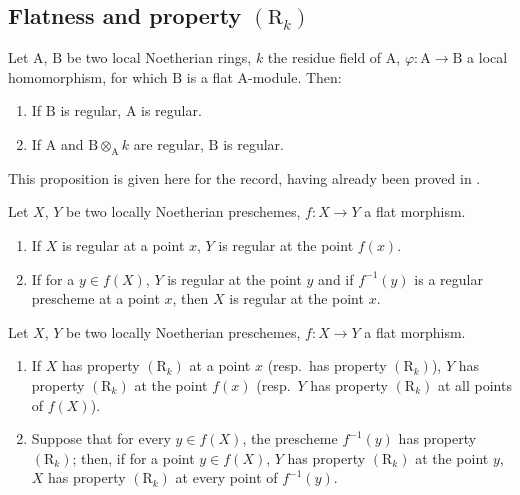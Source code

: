 \subsection{Flatness and property \texorpdfstring{$(\mathrm{R}_k)$}{(Rk)}}
\label{subsection:IV.6.5}

\begin{proposition}[6.5.1]
\label{IV.6.5.1}
Let $\mathrm{A}$, $\mathrm{B}$ be two local Noetherian rings, $k$ the residue field of $\mathrm{A}$, $\varphi:\mathrm{A}\to\mathrm{B}$ a local homomorphism, for which $\mathrm{B}$ is a flat $\mathrm{A}$-module.
Then:
\begin{enumerate}[label=\upshape(\roman*)]
  \item If $\mathrm{B}$ is regular, $\mathrm{A}$ is regular.
  \item If $\mathrm{A}$ and $\mathrm{B}\otimes_\mathrm{A} k$ are regular, $\mathrm{B}$ is regular.
\end{enumerate}
\end{proposition}

This proposition is given here for the record, having already been proved in .

\begin{corollary}[6.5.2]
\label{IV.6.5.2}
Let $X$, $Y$ be two locally Noetherian preschemes, $f:X\to Y$ a flat morphism.
\begin{enumerate}[label=\upshape(\roman*)]
  \item If $X$ is regular at a point $x$, $Y$ is regular at the point $f(x)$.
  \item If for a $y\in f(X)$, $Y$ is regular at the point $y$ and if $f^{-1}(y)$ is a regular prescheme at a point $x$, then $X$ is regular at the point $x$.
\end{enumerate}
\end{corollary}

\begin{proposition}[6.5.3]
\label{IV.6.5.3}
Let $X$, $Y$ be two locally Noetherian preschemes, $f:X\to Y$ a flat morphism.
\begin{enumerate}[label=\upshape(\roman*)]
  \item If $X$ has property $(\mathrm{R}_k)$ at a point $x$ \textnormal{(resp.\ }has property $(\mathrm{R}_k)$\textnormal{)}, $Y$ has property $(\mathrm{R}_k)$ at the point $f(x)$ \textnormal{(resp.\ }$Y$ has property $(\mathrm{R}_k)$ at all points of $f(X)$\textnormal{)}.
  \item Suppose that for every $y\in f(X)$, the prescheme $f^{-1}(y)$ has property $(\mathrm{R}_k)$; then, if for a point $y\in f(X)$, $Y$ has property $(\mathrm{R}_k)$ at the point $y$, $X$ has property $(\mathrm{R}_k)$ at every point of $f^{-1}(y)$.
\end{enumerate}
\end{proposition}

